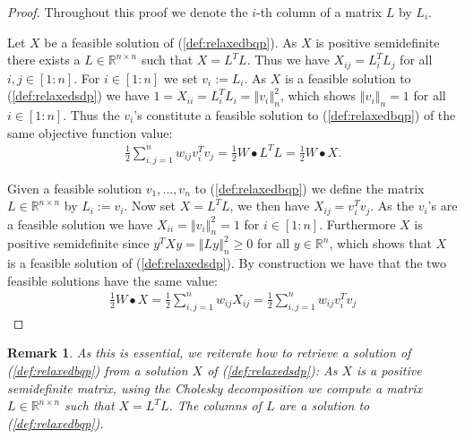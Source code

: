 \documentclass[12pt,a4paper]{article}
\theoremstyle{mythm}
\newtheorem*{rem}{Remark}
\begin{document}
\begin{proof}
Throughout this proof we denote the $ i $-th column of a matrix $ L $ by $ L_i $. 

Let $ X $ be a feasible solution of (\ref{def:relaxedbqp}). 
As $ X $ is positive semidefinite there exists a $ L \in \mathbb{R} ^{ n \times n }  $ such that $ X = L ^T L $. 
Thus we have $ X _{ ij } = L_i ^T L_j $ for all $ i,j \in \left[ 1:n \right]  $.
For $ i \in \left[ 1:n \right] $ we set $ v_i := L_i $.
As $ X $ is a feasible solution to (\ref{def:relaxedsdp}) we have $ 1 = X _{ ii } = L_i ^T L_i = \left\Vert v_i \right\Vert ^{ 2 } _{ n } $, which shows $ \left\Vert v_i
\right\Vert _{ n } = 1 $ for all $ i \in \left[ 1:n \right]  $. Thus the $ v_i $'s constitute a feasible solution to (\ref{def:relaxedbqp}) of the same objective function value:
\begin{align*}
\frac{ 1 }{ 2 } \sum_{ i,j = 1 }^{ n } w _{ ij } v_i ^T v_j = \frac{ 1 }{ 2 } W \bullet L^T L = \frac{ 1 }{ 2 } W \bullet X.
\end{align*} 

Given a feasible solution $ v_1 , \dots , v_n $	to (\ref{def:relaxedbqp}) we define the matrix $ L \in \mathbb{R} ^{ n \times n } $ by $ L_i := v_i $. 
Now set $ X = L^T L $, we then have $ X _{ ij } = v_i ^T v_j $. 
As the $ v_i $'s are a feasible solution we have $ X _{ ii } = \left\Vert v_i \right\Vert ^{ 2 } _{ n } =1 $ for $ i \in \left[ 1:n \right]  $.
Furthermore $ X $ is positive semidefinite since $ y^T X y = \left\Vert Ly \right\Vert ^{ 2 } _{ n } \geq 0  $ for all $ y \in \mathbb{R} ^{ n }  $, which shows that $ X $ is
a feasible solution of (\ref{def:relaxedsdp}).
By construction we have that the two feasible solutions have the same value:
\begin{align*}
\frac{ 1 }{ 2 } W \bullet X = \frac{ 1 }{ 2 } \sum_{ i,j = 1 }^{ n } w _{ ij } X _{ ij } = \frac{ 1 }{ 2 } \sum_{ i,j = 1 }^{ n } w _{ ij } v_i ^T v_j
\end{align*} 
\end{proof}
\begin{rem}
As this is essential, we reiterate how to retrieve a solution of (\ref{def:relaxedbqp}) from a solution $ X $ of (\ref{def:relaxedsdp}):
As $ X $ is a positive semidefinite matrix, using the Cholesky decomposition we compute a matrix $ L \in \mathbb{R} ^{ n \times n }  $ such that $ X = L^T L $. The columns of $
L $ are a solution to (\ref{def:relaxedbqp}).
\end{rem} 
\end{document}
